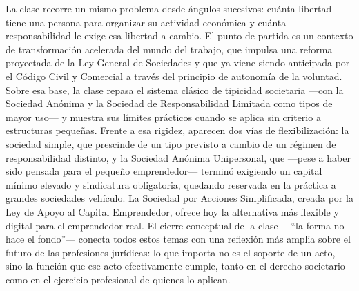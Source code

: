 \documentclass[12pt,oneside]{book}
\begin{document}
La clase recorre un mismo problema desde ángulos sucesivos: cuánta libertad tiene una persona para organizar su actividad económica y cuánta responsabilidad le exige esa libertad a cambio. El punto de partida es un contexto de transformación acelerada del mundo del trabajo, que impulsa una reforma proyectada de la Ley General de Sociedades y que ya viene siendo anticipada por el Código Civil y Comercial a través del principio de autonomía de la voluntad. Sobre esa base, la clase repasa el sistema clásico de tipicidad societaria —con la Sociedad Anónima y la Sociedad de Responsabilidad Limitada como tipos de mayor uso— y muestra sus límites prácticos cuando se aplica sin criterio a estructuras pequeñas. Frente a esa rigidez, aparecen dos vías de flexibilización: la sociedad simple, que prescinde de un tipo previsto a cambio de un régimen de responsabilidad distinto, y la Sociedad Anónima Unipersonal, que —pese a haber sido pensada para el pequeño emprendedor— terminó exigiendo un capital mínimo elevado y sindicatura obligatoria, quedando reservada en la práctica a grandes sociedades vehículo. La Sociedad por Acciones Simplificada, creada por la Ley de Apoyo al Capital Emprendedor, ofrece hoy la alternativa más flexible y digital para el emprendedor real. El cierre conceptual de la clase —``la forma no hace el fondo''— conecta todos estos temas con una reflexión más amplia sobre el futuro de las profesiones jurídicas: lo que importa no es el soporte de un acto, sino la función que ese acto efectivamente cumple, tanto en el derecho societario como en el ejercicio profesional de quienes lo aplican.
\end{document}
